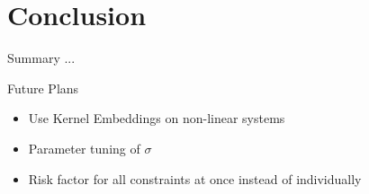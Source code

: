 \documentclass[student, noshadow, itr, english, aspectratio=169]{ITR_LSR_slides}
\begin{document}
\section{Conclusion}

\begin{frame}{Summary}
	...
\end{frame}

\begin{frame}{Future Plans}
	\begin{itemize}
	\item Use Kernel Embeddings on non-linear systems
	\item Parameter tuning of $\sigma$
	\item Risk factor for all constraints at once instead of individually
	\end{itemize}
\end{frame}

	\appendix


\begin{frame}{\LSRITRRefTitle}
	\printbibliography
\end{frame}
\end{document}

